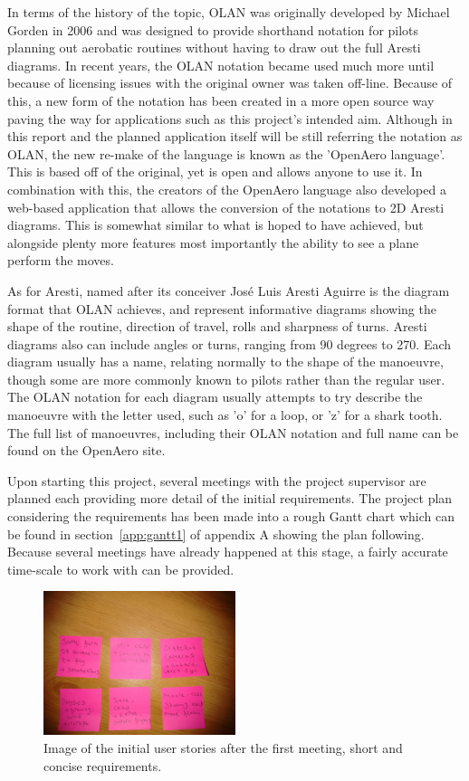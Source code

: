 In terms of the history of the topic, OLAN was originally developed by Michael Gorden in 2006\cite{Olan_Intro} and was designed to provide shorthand notation for pilots planning out aerobatic routines without having to draw out the full Aresti diagrams. In recent years, the OLAN notation became used much more until because of licensing issues with the original owner was taken off-line. Because of this, a new form of the notation has been created in a more open source way paving the way for applications such as this project's intended aim. Although in this report and the planned application itself will be still referring the notation as OLAN, the new re-make of the language is known as the 'OpenAero language'\cite{OpenAero_Language}. This is based off of the original, yet is open and allows anyone to use it. In combination with this, the creators of the OpenAero language also developed a web-based application\cite{OpenAero_Application} that allows the conversion of the notations to 2D Aresti diagrams. This is somewhat similar to what is hoped to have achieved, but alongside plenty more features most importantly the ability to see a plane perform the moves.

As for Aresti, named after its conceiver José Luis Aresti Aguirre\cite{Aresti} is the diagram format that OLAN achieves, and represent informative diagrams showing the shape of the routine, direction of travel, rolls and sharpness of turns. Aresti diagrams also can include angles or turns, ranging from 90 degrees to 270. Each diagram usually has a name\cite{Aresti_Simple}, relating normally to the shape of the manoeuvre, though some are more commonly known to pilots rather than the regular user. The OLAN notation for each diagram usually attempts to try describe the manoeuvre with the letter used, such as 'o' for a loop, or 'z' for a shark tooth. The full list of manoeuvres, including their OLAN notation and full name can be found on the OpenAero\cite{OpenAero_Language} site.

Upon starting this project, several meetings with the project supervisor are planned each providing more detail of the initial requirements. The project plan considering the requirements has been made into a rough Gantt chart which can be found in section~\ref{app:gantt1} of appendix A showing the plan following. Because several meetings have already happened at this stage, a fairly accurate time-scale to work with can be provided.\\

\begin{figure}[h!]
  \centering
      \includegraphics[width=0.5\textwidth]{images/notes.jpg}
  \caption{Image of the initial user stories after the first meeting, short and concise requirements.}
\end{figure}

